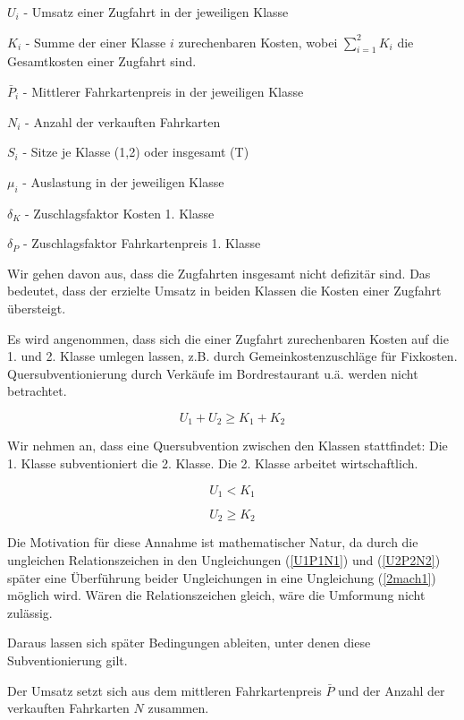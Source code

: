 \documentclass[a4paper,12pt]{article}
\begin{document}
$U_i$ - Umsatz einer Zugfahrt in der jeweiligen Klasse

$K_i$ - Summe der einer Klasse $i$ zurechenbaren Kosten, wobei $\sum_{i=1}^2 K_i$ die Gesamtkosten einer Zugfahrt sind.

$\bar P_i$ - Mittlerer Fahrkartenpreis in der jeweiligen Klasse

$N_i$ - Anzahl der verkauften Fahrkarten 

$S_i$ - Sitze je Klasse (1,2) oder insgesamt (T)

$\mu_i$ - Auslastung in der jeweiligen Klasse

$\delta_K$ - Zuschlagsfaktor Kosten 1. Klasse 

$\delta_P$ - Zuschlagsfaktor Fahrkartenpreis 1. Klasse 

Wir gehen davon aus, dass die Zugfahrten insgesamt nicht defizitär sind. Das bedeutet, dass der erzielte Umsatz in beiden Klassen die Kosten einer Zugfahrt übersteigt. 

Es wird angenommen, dass sich die einer Zugfahrt zurechenbaren Kosten auf die 1. und 2. Klasse umlegen lassen, z.B. durch Gemeinkostenzuschläge für Fixkosten. Quersubventionierung durch Verkäufe im Bordrestaurant u.ä. werden nicht betrachtet.

\begin{equation}
 U_1 + U_2 \geq K_1 + K_2
\end{equation}

Wir nehmen an, dass eine Quersubvention zwischen den Klassen stattfindet: Die 1. Klasse subventioniert die 2. Klasse. Die 2. Klasse arbeitet wirtschaftlich. 

\begin{equation}
 U_1 < K_1 
\label{U1P1N1}
 \end{equation}

\begin{equation}
 U_2 \geq K_2
 \label{U2P2N2}
\end{equation}

Die Motivation für diese Annahme ist mathematischer Natur, da durch die ungleichen Relationszeichen in den Ungleichungen (\ref{U1P1N1}) und (\ref{U2P2N2}) später eine Überführung beider Ungleichungen in eine Ungleichung (\ref{2mach1}) möglich wird. Wären die Relationszeichen gleich, wäre die Umformung nicht zulässig.

Daraus lassen sich später Bedingungen ableiten, unter denen diese Subventionierung gilt.

Der Umsatz setzt sich aus dem mittleren Fahrkartenpreis $\bar P$ und der Anzahl der verkauften Fahrkarten $N$ zusammen.
\end{document}
